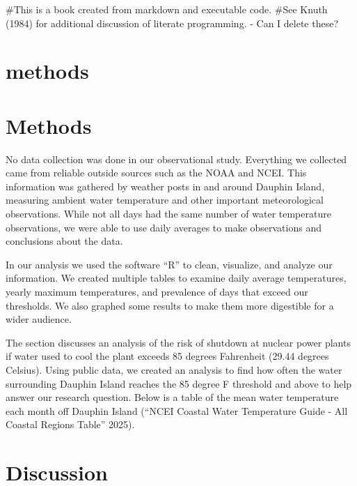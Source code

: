 \documentclass[
  letterpaper,
  DIV=11,
  numbers=noendperiod]{scrreprt}
\begin{document}
\#This is a book created from markdown and executable code. \#See Knuth
(1984) for additional discussion of literate programming. - Can I delete
these?


\chapter{methods}\label{methods}


\chapter{Methods}\label{methods-1}

No data collection was done in our observational study. Everything we
collected came from reliable outside sources such as the NOAA and NCEI.
This information was gathered by weather posts in and around Dauphin
Island, measuring ambient water temperature and other important
meteorological observations. While not all days had the same number of
water temperature observations, we were able to use daily averages to
make observations and conclusions about the data.

In our analysis we used the software ``R'' to clean, visualize, and
analyze our information. We created multiple tables to examine daily
average temperatures, yearly maximum temperatures, and prevalence of
days that exceed our thresholds. We also graphed some results to make
them more digestible for a wider audience.

The section discusses an analysis of the risk of shutdown at nuclear
power plants if water used to cool the plant exceeds 85 degrees
Fahrenheit (29.44 degrees Celsius). Using public data, we created an
analysis to find how often the water surrounding Dauphin Island reaches
the 85 degree F threshold and above to help answer our research
question. Below is a table of the mean water temperature each month off
Dauphin Island ({``NCEI Coastal Water Temperature Guide - All Coastal
Regions Table''} 2025).


\chapter{Discussion}\label{discussion}
\end{document}

